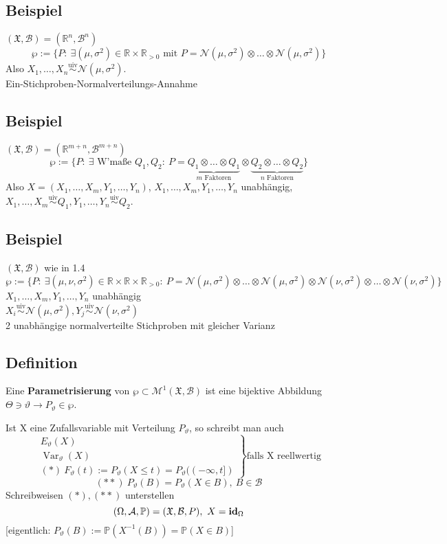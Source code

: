 \documentclass[a4paper,11pt,twoside,titlepage]{article}
\newcommand{\R}{{\mathbb R}}
\newcommand{\PP}{{\mathbb P}} %
\newcommand{\XX}{{\mathfrak X}} %
\newcommand{\MM}{{\mathcal M}}
\newcommand\AAA{ \mathcal{A} } %
\newcommand\BB{ \mathcal{B} } %
\newcommand\NN{ \mathcal{N} } %
\newcommand{\id}{\text{\bf{id}}} %
\DeclareMathOperator{\var}{Var}
\begin{document}
\subsection{Beispiel}
$(\XX,\BB)=(\R^n,\BB^n)$
\[\wp:=\{P:\ \exists(\mu,\sigma^2)\in\R\times\R_{>0}\mbox{ mit }P=\NN(\mu,\sigma^2)\otimes\ldots\otimes \NN(\mu,\sigma^2)\}\]
Also $X_1,\ldots,X_n\stackrel{\mbox{uiv}}{\sim}\NN(\mu,\sigma^2)$.\\
Ein-Stichproben-Normalverteilungs-Annahme

\subsection{Beispiel}
$(\XX,\BB)=(\R^{m+n},\BB^{m+n})$
\[\wp:=\{P:\ \exists\mbox{ W'maße } Q_1,Q_2:\ P=\underbrace{Q_1\otimes\ldots\otimes Q_1}_{m\mbox{ Faktoren}}\otimes\underbrace{Q_2\otimes\ldots\otimes Q_2}_{n\mbox{ Faktoren}}\}\]
Also $X=(X_1,\ldots,X_m,Y_1,\ldots,Y_n)$, $X_1,\ldots,X_m,Y_1,\ldots,Y_n$ unabhängig,\\ $X_1,\ldots,X_m\stackrel{\mbox{uiv}}{\sim}Q_1, Y_1,\ldots,Y_n\stackrel{\mbox{uiv}}{\sim}Q_2$.

\subsection{Beispiel}
$(\XX,\BB)$ wie in 1.4
\[\wp:=\{P:\ \exists(\mu,\nu,\sigma^2)\in\R\times\R\times\R_{>0}:\ P=\NN(\mu,\sigma^2)\otimes\ldots\otimes \NN(\mu,\sigma^2)\otimes\NN(\nu,\sigma^2)\otimes\ldots\otimes\NN(\nu,\sigma^2)\}\]
$X_1,\ldots,X_m,Y_1,\ldots,Y_n$ unabhängig\\
$X_i\stackrel{\mbox{uiv}}{\sim}\NN(\mu,\sigma^2), Y_j\stackrel{\mbox{uiv}}{\sim}\NN(\nu,\sigma^2)$\\
2 unabhängige normalverteilte Stichproben mit gleicher Varianz

\subsection{Definition}
Eine \textbf{Parametrisierung} von $\wp\subset\MM^1(\XX,\BB)$ ist eine bijektive Abbildung $\Theta\ni\vartheta\to P_\vartheta\in\wp$.

Ist X eine Zufallsvariable mit Verteilung $P_\vartheta$, so schreibt man auch
\[\left.\begin{array}{l}E_\vartheta(X)\\\var_\vartheta(X)\\(\ast)\ F_\vartheta(t):=P_\vartheta(X\leq t)=P_\vartheta((-\infty,t])\end{array}\right\}\mbox{falls X reellwertig}\]
\[(\ast\ast)\ P_\vartheta(B)=P_\vartheta(X\in B),\ B\in\BB\]
Schreibweisen $(\ast),(\ast\ast)$ unterstellen
\[(\Omega,\AAA,\PP)=(\XX,\BB,P),\ X=\id_\Omega\]
[eigentlich: \(P_\vartheta(B):=\PP(X^{-1}(B))=\PP(X\in B)\)]
\end{document}
